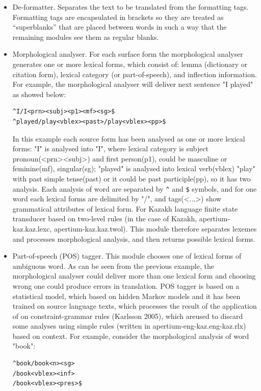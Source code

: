 \documentclass[11pt]{article}
\begin{document}
\begin{itemize}
\item 	De-formatter. Separates the text to be translated from the formatting tags.  Formatting tags are encapsulated in brackets so they are treated as ``superblanks'' that are placed between words in such a way that the remaining modules see them as regular blanks.  
\item	Morphological analyser. For each surface form the morphological analyser generates one or more lexical forms, which consist of: lemma (dictionary or citation form), lexical category (or part-of-speech), and inflection information. 
For example, the morphological analyser will deliver next sentence "I played" as showed below:
\begin{verbatim}
^I/I<prn><subj><p1><mf><sg>$ 
^played/play<vblex><past>/play<vblex><pp>$
\end{verbatim}
In this example each source form has been analysed as one or more lexical forms: "I" is analysed into "I", where lexical category is subject pronoun(<prn><subj>) and first person(p1), could be masculine or feminine(mf), singular(sg); "played" is analysed into lexical verb(vblex) "play" with past simple tense(past) or it could be past participle(pp), so it has two analysis. Each analysis of word are separated by \texttt{\^{}} and \texttt{\$} symbols, and for one word each lexical forms are delimited by "/", and tags(<...>) show grammatical attributes of lexical form. 
 For Kazakh language finite state transducer based on two-level rules (in the case of Kazakh, apertium-kaz.kaz.lexc, apertium-kaz.kaz.twol). This module therefore separates lexemes and processes morphological analysis, and then returns possible lexical forms.
\item	Part-of-speech (POS) tagger. This module chooses one of lexical forms of ambiguous word. As can be seen from the previous example, the morphological analyser could deliver more than one lexical form and choosing wrong one could produce errors in translation. POS tagger is based on a statistical model, which based on hidden Markov models and it has been trained on source language texts, which processes the result of the application of  on constraint-grammar rules (Karlsson 2005), which areused to discard some analyses  using simple rules (written in apertium-eng-kaz.eng-kaz.rlx) based on context. For example, consider the morphological analysis of word "book":
\begin{verbatim}
^book/book<n><sg>
/book<vblex><inf>
/book<vblex><pres>$
\end{verbatim}

\end{itemize}
\end{document}
